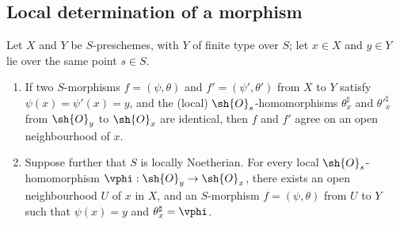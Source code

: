 \subsection{Local determination of a morphism}
\label{subsection:I.6.5}
\label{I.6.5}

\begin{proposition}[6.5.1]
\label{I.6.5.1}
Let $X$ and $Y$ be $S$-preschemes, with $Y$ of finite type over $S$;
let $x\in X$ and $y\in Y$ lie over the same point $s\in S$.
\begin{enumerate}
  \item[{\rm(i)}] If two $S$-morphisms $f=(\psi,\theta)$ and $f'=(\psi',\theta')$ from $X$ to $Y$ satisfy $\psi(x)=\psi'(x)=y$, and the (local) $\sh{O}_s$-homomorphisms $\theta_x^\sharp$ and ${\theta'}_x^\sharp$ from $\sh{O}_y$ to $\sh{O}_x$ are identical, then $f$ and $f'$ agree on an open neighbourhood of $x$.
  \item[{\rm(ii)}] Suppose further that $S$ is locally Noetherian.
    For every local $\sh{O}_s$-homomorphism $\vphi:\sh{O}_y\to\sh{O}_x$, there exists an open neighbourhood $U$ of $x$ in $X$, and an $S$-morphism $f=(\psi,\theta)$ from $U$ to $Y$ such that $\psi(x)=y$ and $\theta_x^\sharp=\vphi$.
\end{enumerate}
\end{proposition}

